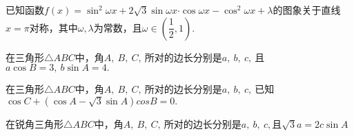 \begin{questions}
\newpage
\qs 已知函数$f(x)=\sin^2 \omega x+2\sqrt{3}\sin \omega x\bm{\cdot}\cos \omega x-\cos^2 \omega x+\lambda$的图象关于直线$ x=\pi $对称，其中$ {\omega ,\lambda} $为常数，且$ \omega \in \left(\dfrac{1}{2},1\right). $
\kongbai
\qs 在三角形$\triangle ABC$中，角$A,\ B,\ C,\ $所对的边长分别是$a,\ b,\ c,\ $且$ a\cos B=3,\ b\sin A=4. $
\kongbai
\qs 在三角形$\triangle ABC$中，角$A,\ B,\ C,\ $所对的边长分别是$a,\ b,\ c,\ $已知$ \cos C+(\cos A-\sqrt{3}\sin A)cos B=0. $
\kongbai
\qs 在锐角三角形$\triangle ABC$中，角$A,\ B,\ C,\ $所对的边长分别是$a,\ b,\ c,$且$ \sqrt{3}a=2c\sin A $
\begin{parts}

\end{parts}
\end{questions}
